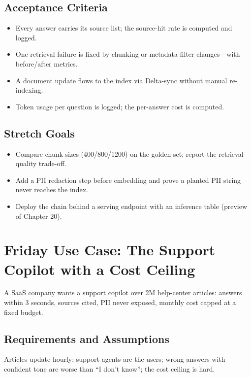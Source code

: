 \subsection*{Acceptance Criteria}
\begin{itemize}
    \item Every answer carries its source list; the source-hit rate is computed and logged.
    \item One retrieval failure is fixed by chunking or metadata-filter changes---with before/after metrics.
    \item A document update flows to the index via Delta-sync without manual re-indexing.
    \item Token usage per question is logged; the per-answer cost is computed.
\end{itemize}

\subsection*{Stretch Goals}
\begin{itemize}
    \item Compare chunk sizes (400/800/1200) on the golden set; report the retrieval-quality trade-off.
    \item Add a PII redaction step before embedding and prove a planted PII string never reaches the index.
    \item Deploy the chain behind a serving endpoint with an inference table (preview of Chapter 20).
\end{itemize}

\section{Friday Use Case: The Support Copilot with a Cost Ceiling}
A SaaS company wants a support copilot over 2M help-center articles: answers within 3 seconds, sources cited, PII never exposed, monthly cost capped at a fixed budget.

\subsection{Requirements and Assumptions}
Articles update hourly; support agents are the users; wrong answers with confident tone are worse than ``I don't know''; the cost ceiling is hard.

